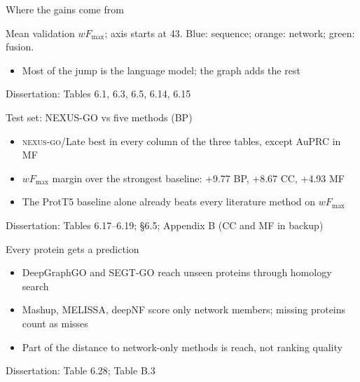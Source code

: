 \documentclass[aspectratio=169,10pt]{beamer}
\newcommand{\src}[1]{\par\vfill\hfill{\scriptsize\color{gray}Dissertation: #1}}
\newcommand{\wF}{wF_{\max}}
\newcommand{\NX}[1]{\textsc{nexus-go}/#1}
\begin{document}
\begin{frame}{Where the gains come from}
  \begin{center}
  \end{center}
  {\scriptsize Mean validation $\wF$; axis starts at 43. Blue: sequence; orange: network; green: fusion.}
  \begin{itemize}
    \item Most of the jump is the language model; the graph adds the rest
  \end{itemize}
  \src{Tables 6.1, 6.3, 6.5, 6.14, 6.15}
\end{frame}

\begin{frame}{Test set: NEXUS-GO vs five methods (BP)}
  \begin{center}\scriptsize\TabTestBP\end{center}
  \begin{itemize}\small
    \item \NX{Late} best in every column of the three tables, except AuPRC in MF
    \item $\wF$ margin over the strongest baseline: +9.77 BP, +8.67 CC, +4.93 MF
    \item The ProtT5 baseline alone already beats every literature method on $\wF$
  \end{itemize}
  \src{Tables 6.17--6.19; §6.5; Appendix B (CC and MF in backup)}
\end{frame}

\begin{frame}{Every protein gets a prediction}
  \begin{center}\small\TabCov\end{center}
  \begin{itemize}
    \item DeepGraphGO and SEGT-GO reach unseen proteins through homology search
    \item Mashup, MELISSA, deepNF score only network members; missing proteins count as misses
    \item Part of the distance to network-only methods is reach, not ranking quality
  \end{itemize}
  \src{Table 6.28; Table B.3}
\end{frame}
\end{document}

